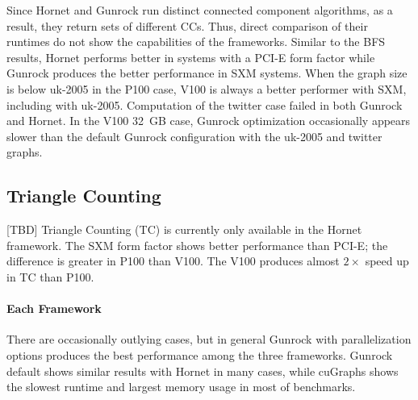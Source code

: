 Since Hornet and Gunrock run distinct connected component algorithms, as a result, they return sets of different CCs. Thus, direct comparison of their runtimes do not show the capabilities of the frameworks. Similar to the BFS results, Hornet performs better in systems with a PCI-E form factor while Gunrock produces the better performance in SXM systems. When the graph size is below uk-2005 in the P100 case, V100 is always a better performer with SXM, including with uk-2005. Computation of the twitter case failed in both Gunrock and Hornet. In the V100 32~GB case, Gunrock optimization occasionally appears slower than the default Gunrock configuration with the uk-2005 and twitter graphs.




\subsection{Triangle Counting}

[TBD] Triangle Counting (TC) is currently only available in the Hornet framework. The SXM form factor shows better performance than PCI-E; the difference is greater in P100 than V100. The V100 produces almost $2\times$ speed up in TC than P100.


\paragraph{Each Framework}
There are occasionally outlying cases, but in general Gunrock with parallelization options produces the best performance among the three frameworks. Gunrock default shows similar results with Hornet in many cases, while cuGraphs shows the slowest runtime and largest memory usage in most of benchmarks.

